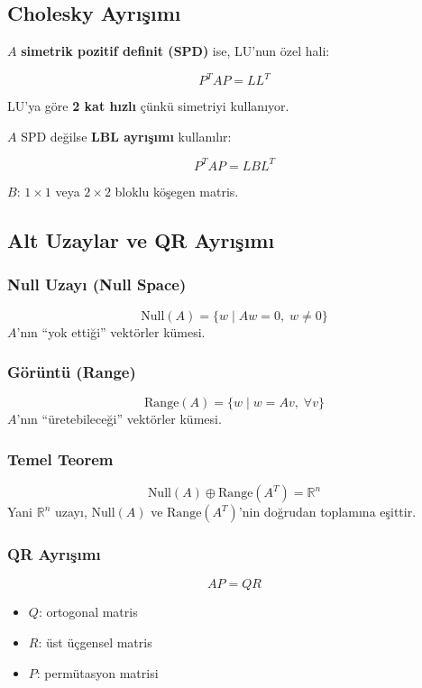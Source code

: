 \documentclass[12pt,a4paper]{article}
\theoremstyle{definition}
\theoremstyle{remark}
\begin{document}
\subsection{Cholesky Ayr{\i}\c{s}{\i}m{\i}}

$A$ \textbf{simetrik pozitif definit (SPD)} ise, LU'nun \"ozel hali:

\[
P^T A P = L L^T
\]

LU'ya g\"ore \textbf{2 kat h{\i}zl{\i}} \c{c}\"unk\"u simetriyi kullan{\i}yor.

$A$ SPD de\u{g}ilse \textbf{LBL ayr{\i}\c{s}{\i}m{\i}} kullan{\i}l{\i}r:

\[
P^T A P = L B L^T
\]

$B$: $1 \times 1$ veya $2 \times 2$ bloklu k\"o\c{s}egen matris.

\subsection{Alt Uzaylar ve QR Ayr{\i}\c{s}{\i}m{\i}}

\subsubsection{Null Uzay{\i} (Null Space)}
\[
\text{Null}(A) = \{w \mid Aw = 0,\; w \neq 0\}
\]
$A$'n{\i}n ``yok etti\u{g}i'' vekt\"orler k\"umesi.

\subsubsection{G\"or\"unt\"u (Range)}
\[
\text{Range}(A) = \{w \mid w = Av,\; \forall v\}
\]
$A$'n{\i}n ``\"uretebilece\u{g}i'' vekt\"orler k\"umesi.

\subsubsection{Temel Teorem}
\[
\text{Null}(A) \oplus \text{Range}(A^T) = \mathbb{R}^n
\]
Yani $\mathbb{R}^n$ uzay{\i}, $\text{Null}(A)$ ve $\text{Range}(A^T)$'nin do\u{g}rudan toplam{\i}na e\c{s}ittir.

\subsubsection{QR Ayr{\i}\c{s}{\i}m{\i}}
\[
AP = QR
\]
\begin{itemize}
    \item $Q$: ortogonal matris
    \item $R$: \"ust \"u\c{c}gensel matris
    \item $P$: perm\"utasyon matrisi
\end{itemize}
\end{document}

